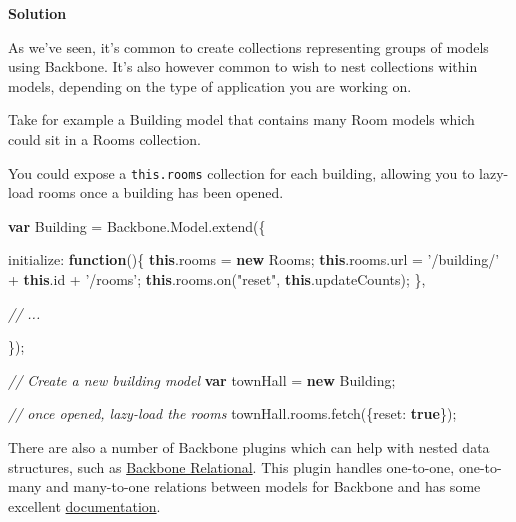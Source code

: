 \documentclass[9pt]{book}
\newenvironment{Shaded}{}{}
\newcommand{\KeywordTok}[1]{\textcolor[rgb]{0.00,0.44,0.13}{\textbf{{#1}}}}
\newcommand{\DataTypeTok}[1]{\textcolor[rgb]{0.56,0.13,0.00}{{#1}}}
\newcommand{\StringTok}[1]{\textcolor[rgb]{0.25,0.44,0.63}{{#1}}}
\newcommand{\CommentTok}[1]{\textcolor[rgb]{0.38,0.63,0.69}{\textit{{#1}}}}
\newcommand{\OtherTok}[1]{\textcolor[rgb]{0.00,0.44,0.13}{{#1}}}
\newcommand{\FunctionTok}[1]{\textcolor[rgb]{0.02,0.16,0.49}{{#1}}}
\newcommand{\NormalTok}[1]{{#1}}
\begin{document}
\textbf{Solution}

As we've seen, it's common to create collections representing groups of
models using Backbone. It's also however common to wish to nest
collections within models, depending on the type of application you are
working on.

Take for example a Building model that contains many Room models which
could sit in a Rooms collection.

You could expose a \texttt{this.rooms} collection for each building,
allowing you to lazy-load rooms once a building has been opened.

\begin{Shaded}
\begin{Highlighting}[]
\KeywordTok{var} \NormalTok{Building = }\OtherTok{Backbone}\NormalTok{.}\OtherTok{Model}\NormalTok{.}\FunctionTok{extend}\NormalTok{(\{}

    \DataTypeTok{initialize}\NormalTok{: }\KeywordTok{function}\NormalTok{()\{}
        \KeywordTok{this}\NormalTok{.}\FunctionTok{rooms} \NormalTok{= }\KeywordTok{new} \NormalTok{Rooms;}
        \KeywordTok{this}\NormalTok{.}\OtherTok{rooms}\NormalTok{.}\FunctionTok{url} \NormalTok{= }\StringTok{'/building/'} \NormalTok{+ }\KeywordTok{this}\NormalTok{.}\FunctionTok{id} \NormalTok{+ }\StringTok{'/rooms'}\NormalTok{;}
        \KeywordTok{this}\NormalTok{.}\OtherTok{rooms}\NormalTok{.}\FunctionTok{on}\NormalTok{(}\StringTok{"reset"}\NormalTok{, }\KeywordTok{this}\NormalTok{.}\FunctionTok{updateCounts}\NormalTok{);}
    \NormalTok{\},}

    \CommentTok{// ...}

\NormalTok{\});}

\CommentTok{// Create a new building model}
\KeywordTok{var} \NormalTok{townHall = }\KeywordTok{new} \NormalTok{Building;}

\CommentTok{// once opened, lazy-load the rooms}
\OtherTok{townHall}\NormalTok{.}\OtherTok{rooms}\NormalTok{.}\FunctionTok{fetch}\NormalTok{(\{}\DataTypeTok{reset}\NormalTok{: }\KeywordTok{true}\NormalTok{\});}
\end{Highlighting}
\end{Shaded}

There are also a number of Backbone plugins which can help with nested
data structures, such as
\href{https://github.com/PaulUithol/Backbone-relational}{Backbone
Relational}. This plugin handles one-to-one, one-to-many and many-to-one
relations between models for Backbone and has some excellent
\href{http://backbonerelational.org/}{documentation}.
\end{document}
